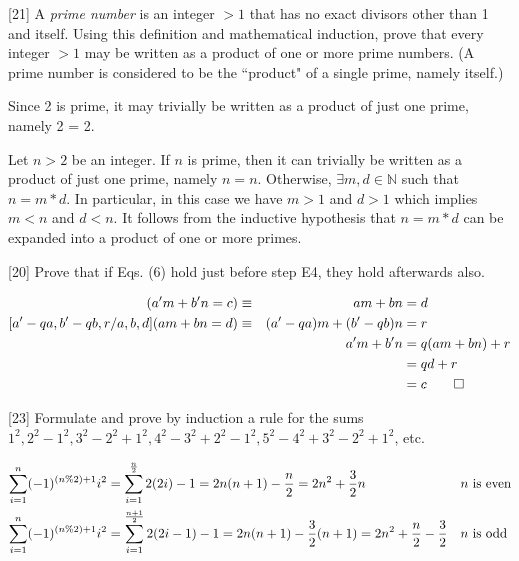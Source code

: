 \documentclass{amsart}
\begin{document}
\begin{problem}{[}21{]}
  A \emph{prime number} is an integer \(> 1\) that has no exact divisors other
  than 1 and itself. Using this definition and mathematical induction, prove
  that every integer \(> 1\) may be written as a product of one or more prime
  numbers. (A prime number is considered to be the ``product" of a single prime,
  namely itself.)
\end{problem}

\begin{solution}
  Since 2 is prime, it may trivially be written as a product of just one prime,
  namely 2 = 2.

  Let \(n > 2\) be an integer. If \(n\) is prime, then it can trivially be
  written as a product of just one prime, namely \(n = n\). Otherwise,
  \(\exists m,d \in \mathbb{N}\) such that \(n = m * d\). In particular, in
  this case we have \(m > 1\) and \(d > 1\) which implies \(m < n\) and
  \(d < n\). It follows from the inductive hypothesis that \(n=m*d\) can be
  expanded into a product of one or more primes.
\end{solution}

\begin{problem}{[}20{]}
  Prove that if Eqs. (6) hold just before step E4, they hold afterwards also.
\end{problem}

\begin{solution}
  \begin{align*}
    [a,b,d/a',b',c](a'm + b'n = c) &\equiv & am + bn &= d \\
    [a'-qa,b'-qb,r/a,b,d](am + bn = d) &\equiv & (a'-qa)m + (b'-qb)n &= r \\
    & & a'm + b'n &= q(am + bn) + r \\
    & & &= qd + r \\
    & & &= c \qed
  \end{align*}
\end{solution}

\begin{problem}{[}23{]}
  Formulate and prove by induction a rule for the sums \(1^2, 2^2 - 1^2, 3^2 -
  2^2 + 1^2, 4^2 - 3^2 + 2^2 - 1^2, 5^2 - 4^2 + 3^2 - 2^2 + 1^2\), etc.
\end{problem}

\begin{solution}
  \begin{theorem}
    \begin{align*}
      \sum_{i=1}^n (-1)^{(n\%2)+1}i^2 &=
        \sum_{i=1}^{\frac{n}{2}} 2(2i)-1 = 2n(n+1) - \frac{n}{2} = 2n^2 + \frac{3}{2}n & &\textup{\(n\) is even}\\
      \sum_{i=1}^n (-1)^{(n\%2)+1}i^2 &=
        \sum_{i=1}^{\frac{n+1}{2}} 2(2i-1)-1 = 2n(n+1) - \frac{3}{2}(n+1) = 2n^2 + \frac{n}{2} - \frac{3}{2} & &\textup{\(n\) is odd} \\
    \end{align*}
  \end{theorem}
\end{solution}
\end{document}
